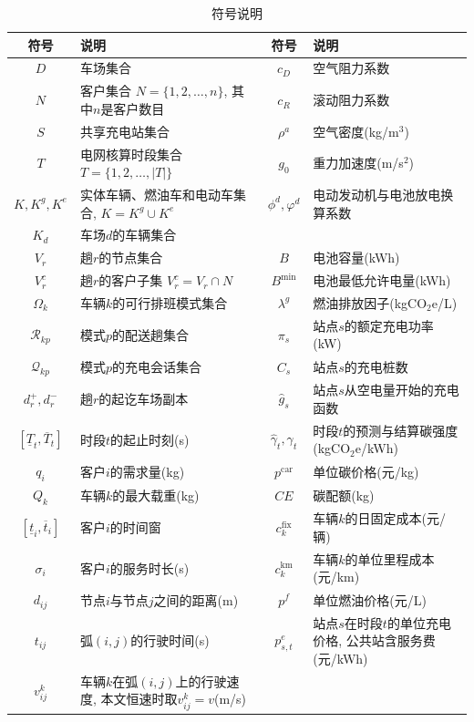 \documentclass{setp-new}
\newcommand{\setpsymtabsetup}{\fontsize{9pt}{10.5pt}\selectfont\renewcommand{\arraystretch}{0.95}\setlength{\tabcolsep}{2.0pt}\setlength{\aboverulesep}{0.4pt}\setlength{\belowrulesep}{0.4pt}\hbadness=10000}
\begin{document}
\begin{table}[H]
\centering
\caption{符号说明}
\label{tab:symbols}
\setpsymtabsetup
\begin{tabular*}{\linewidth}{@{\extracolsep{\fill}}cJcJ@{}}
\toprule
符号 & 说明 & 符号 & 说明\\
\midrule
$D$ & 车场集合 & $c_D$ & 空气阻力系数\\
$N$ & 客户集合 $N=\{1,2,\dots,n\}$, 其中$n$是客户数目 & $c_R$ & 滚动阻力系数\\
$S$ & 共享充电站集合 & $\rho^a$ & 空气密度(kg/m$^3$)\\
$T$ & 电网核算时段集合 $T=\{1,2,\dots,|T|\}$ & $g_0$ & 重力加速度(m/s$^2$)\\
$K,K^g,K^e$ & 实体车辆、燃油车和电动车集合, $K=K^g\cup K^e$ & $\phi^d,\varphi^d$ & 电动发动机与电池放电换算系数\\
$K_d$ & 车场$d$的车辆集合 & & \\
$V_r$ & 趟$r$的节点集合 & $B$ & 电池容量(kWh)\\
$V_r^c$ & 趟$r$的客户子集 $V_r^c=V_r\cap N$ & $B^{\min}$ & 电池最低允许电量(kWh)\\
$\Omega_k$ & 车辆$k$的可行排班模式集合 & $\lambda^g$ & 燃油排放因子(kgCO$_2$e/L)\\
$\mathcal R_{kp}$ & 模式$p$的配送趟集合 & $\pi_s$ & 站点$s$的额定充电功率(kW)\\
$\mathcal Q_{kp}$ & 模式$p$的充电会话集合 & $C_s$ & 站点$s$的充电桩数\\
$d_r^+,d_r^-$ & 趟$r$的起讫车场副本 & $\widehat g_s$ & 站点$s$从空电量开始的充电函数\\
$[\underline T_t,\overline T_t]$ & 时段$t$的起止时刻(s) & $\widehat\gamma_t,\gamma_t$ & 时段$t$的预测与结算碳强度(kgCO$_2$e/kWh)\\
$q_i$ & 客户$i$的需求量(kg) & $p^{\mathrm{car}}$ & 单位碳价格(元/kg)\\
$Q_k$ & 车辆$k$的最大载重(kg) & $CE$ & 碳配额(kg)\\
$[\underline t_i,\overline t_i]$ & 客户$i$的时间窗 & $c_k^{\mathrm{fix}}$ & 车辆$k$的日固定成本(元/辆)\\
$\sigma_i$ & 客户$i$的服务时长(s) & $c_k^{\mathrm{km}}$ & 车辆$k$的单位里程成本(元/km)\\
$d_{ij}$ & 节点$i$与节点$j$之间的距离(m) & $p^f$ & 单位燃油价格(元/L)\\
$t_{ij}$ & 弧$(i,j)$的行驶时间(s) & $p_{s,t}^{e}$ & 站点$s$在时段$t$的单位充电价格, 公共站含服务费(元/kWh)\\
$v_{ij}^k$ & 车辆$k$在弧$(i,j)$上的行驶速度, 本文恒速时取$v_{ij}^k=v$(m/s) & & \\

\end{tabular*}
\end{table}
\end{document}
